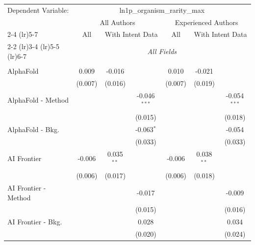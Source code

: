 \begingroup
\centering
\begin{tabular}{lcccccc}
   \tabularnewline \midrule \midrule
   Dependent Variable: & \multicolumn{6}{c}{ln1p\_organism\_rarity\_max}\\
 & \multicolumn{3}{c}{All Authors} & \multicolumn{3}{c}{Experienced Authors} \\
\cmidrule(lr){2-4} \cmidrule(lr){5-7}
 & \multicolumn{1}{c}{All} & \multicolumn{2}{c}{With Intent Data} & \multicolumn{1}{c}{All} & \multicolumn{2}{c}{With Intent Data} \\
\cmidrule(lr){2-2} \cmidrule(lr){3-4} \cmidrule(lr){5-5} \cmidrule(lr){6-7}
 & \multicolumn{6}{c}{\textit{All Fields}} \\ \\
   AlphaFold            & 0.009        & -0.016       &                & 0.010        & -0.021       &   \\   
                        & (0.007)      & (0.016)      &                & (0.007)      & (0.019)      &   \\   
   AlphaFold - Method   &              &              & -0.046$^{***}$ &              &              & -0.054$^{***}$\\   
                        &              &              & (0.015)        &              &              & (0.018)\\   
   AlphaFold - Bkg.     &              &              & -0.063$^{*}$   &              &              & -0.054\\   
                        &              &              & (0.033)        &              &              & (0.033)\\   
   AI Frontier          & -0.006       & 0.035$^{**}$ &                & -0.006       & 0.038$^{**}$ &   \\   
                        & (0.006)      & (0.017)      &                & (0.006)      & (0.018)      &   \\   
   AI Frontier - Method &              &              & -0.017         &              &              & -0.009\\   
                        &              &              & (0.015)        &              &              & (0.016)\\   
   AI Frontier - Bkg.   &              &              & 0.028          &              &              & 0.034\\   
                        &              &              & (0.020)        &              &              & (0.024)\\   

\end{tabular}
